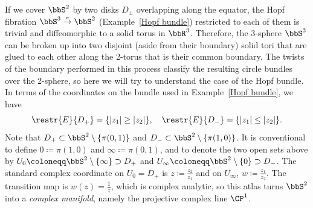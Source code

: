 \begin{example}\label{ex hopf bundle atlas}
    If we cover $\bbS^2$ by two disks $D_\pm$ overlapping along the equator, the Hopf fibration $\bbS^3\overset\pi\to \bbS^2$ (Example~\ref{Hopf bundle}) restricted to each of them is trivial and diffeomorphic to a solid torus in $\bbR^3$. Therefore, the 3-sphere $\bbS^3$ can be broken up into two disjoint (aside from their boundary) solid tori that are glued to each other along the 2-torus that is their common boundary. The twists of the boundary performed in this process classify the resulting circle bundles over the 2-sphere, so here we will try to understand the case of the Hopf bundle. In terms of the coordinates on the bundle used in Example~\ref{Hopf bundle}, we have 
    \[\restr{E}{D_+}=\{|z_1|\geq|z_2|\},\quad \restr{E}{D_-}=\{|z_1|\leq|z_2|\}.\]
    Note that $D_+\subset\bbS^2\setminus \{\pi(0,1)\}$ and $D_-\subset\bbS^2 \setminus \{\pi(1,0)\}$. It is conventional to define $0\coloneqq \pi(1,0)$ and $\infty\coloneqq \pi(0,1)$, and to denote the two open sets above by $U_0\coloneqq \bbS^2\setminus\{\infty\}\supset D_+$ and $U_\infty\coloneqq \bbS^2\setminus\{0\}\supset D_-$. The standard complex coordinate on $U_0=D_+$ is $z\coloneqq \frac{z_2}{z_1}$ and on $U_\infty$, $w\coloneqq \frac{z_1}{z_2}$. The transition map is $w(z)=\frac{1}{z}$, which is complex analytic, so this atlas turns $\bbS^2$ into a \emph{complex manifold}, namely the projective complex line $\CP^1$.
    

\end{example}
